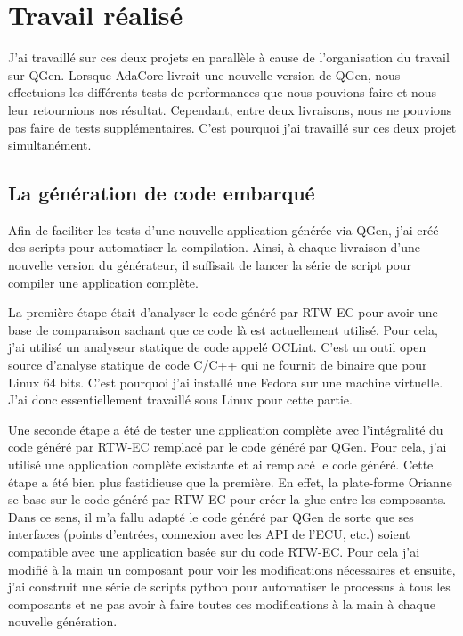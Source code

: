 \chapter{Travail réalisé}
J'ai travaillé sur ces deux projets en parallèle à cause de l'organisation du travail sur QGen.
Lorsque AdaCore livrait une nouvelle version de QGen, nous effectuions les différents tests 
de performances que nous pouvions faire et nous leur retournions nos résultat. Cependant,
entre deux livraisons, nous ne pouvions pas faire de tests supplémentaires. C'est pourquoi
j'ai travaillé sur ces deux projet simultanément.

\section{La génération de code embarqué}
Afin de faciliter les tests d'une nouvelle application générée via QGen, j'ai créé des scripts pour automatiser la compilation.
Ainsi, à chaque livraison d'une nouvelle version du générateur, il suffisait de lancer la série de script pour
compiler une application complète.

La première étape était d'analyser le code généré par RTW-EC\up{\circledR} pour avoir une base de comparaison
sachant que ce code là est actuellement utilisé.
Pour cela, j'ai utilisé un analyseur statique de code appelé OCLint.
C'est un outil open source d'analyse statique de code C/C++ qui ne fournit de binaire que pour Linux 64 bits.
C'est pourquoi j'ai installé une Fedora sur une machine virtuelle. J'ai donc essentiellement travaillé sous Linux pour cette partie.

Une seconde étape a été de tester une application complète avec l'intégralité du code généré par RTW-EC\up{\circledR} remplacé par le code généré par QGen.
Pour cela, j'ai utilisé une application complète existante et ai remplacé le code généré.
Cette étape a été bien plus fastidieuse que la première. En effet, la plate-forme Orianne se base sur le code généré par RTW-EC\up{\circledR} pour créer la \og glue \fg{}
entre les composants. Dans ce sens, il m'a fallu adapté le code généré par QGen de sorte que ses interfaces (points d'entrées, connexion avec les API
de l'ECU, etc.) soient compatible avec une application basée sur du code RTW-EC\up{\circledR}.
Pour cela j'ai modifié à la main un composant pour voir les modifications nécessaires et ensuite, j'ai construit une série de scripts python pour automatiser
le processus à tous les composants et ne pas avoir à faire toutes ces modifications à la main à chaque nouvelle génération.

